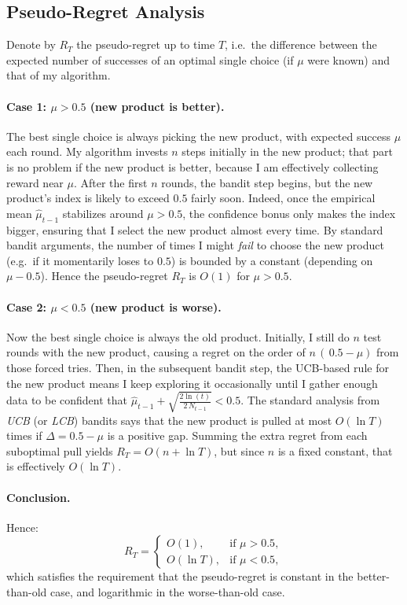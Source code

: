 \subsection*{Pseudo-Regret Analysis}
Denote by $R_T$ the pseudo-regret up to time $T$, i.e.\ the difference between the expected number of successes of an optimal single choice (if $\mu$ were known) and that of my algorithm.

\paragraph{Case 1: $\mu > 0.5$ (new product is better).}
The best single choice is always picking the new product, with expected success $\mu$ each round. My algorithm invests $n$ steps initially in the new product; that part is no problem if the new product is better, because I am effectively collecting reward near $\mu$. After the first $n$ rounds, the bandit step begins, but the new product’s index is likely to exceed $0.5$ fairly soon. Indeed, once the empirical mean $\hat{\mu}_{t-1}$ stabilizes around $\mu>0.5$, the confidence bonus only makes the index bigger, ensuring that I select the new product almost every time. By standard bandit arguments, the number of times I might \emph{fail} to choose the new product (e.g.\ if it momentarily loses to $0.5$) is bounded by a constant (depending on $\mu-0.5$). Hence the pseudo-regret $R_T$ is $O(1)$ for $\mu>0.5$.

\paragraph{Case 2: $\mu < 0.5$ (new product is worse).}
Now the best single choice is always the old product. Initially, I still do $n$ test rounds with the new product, causing a regret on the order of $n\,(\,0.5 - \mu)$ from those forced tries. Then, in the subsequent bandit step, the UCB-based rule for the new product means I keep exploring it occasionally until I gather enough data to be confident that $\hat{\mu}_{t-1} + \sqrt{\frac{2\ln(t)}{2\,N_{t-1}}} < 0.5$. The standard analysis from \emph{UCB} (or \emph{LCB}) bandits says that the new product is pulled at most $O(\ln T)$ times if $\Delta = 0.5 - \mu$ is a positive gap. Summing the extra regret from each suboptimal pull yields $R_T = O(n + \ln T)$, but since $n$ is a fixed constant, that is effectively $O(\ln T)$.

\paragraph{Conclusion.}
Hence:
\[
R_T 
=\begin{cases}
O(1), & \text{if } \mu > 0.5,\\
O(\ln T), & \text{if } \mu < 0.5,
\end{cases}
\]
which satisfies the requirement that the pseudo-regret is constant in the better-than-old case, and logarithmic in the worse-than-old case.